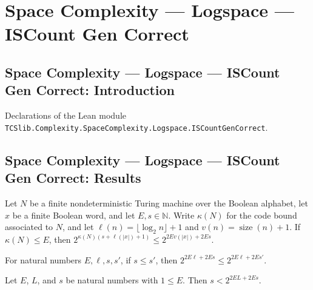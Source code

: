 \section{Space Complexity --- Logspace --- ISCount Gen Correct}
\subsection*{Space Complexity --- Logspace --- ISCount Gen Correct: Introduction}

Declarations of the Lean module \texttt{TCSlib.Complexity.SpaceComplexity.Logspace.ISCountGenCorrect}.

\subsection*{Space Complexity --- Logspace --- ISCount Gen Correct: Results}

\begin{lemma}
\label{Complexity.LogProg.ISGen.code_le_gKv}
\leanok
{}
Let $N$ be a finite nondeterministic Turing machine over the Boolean alphabet, let $x$
be a finite Boolean word, and let $E,s\in\mathbb N$. Write $\kappa(N)$ for the code
bound associated to $N$, and let $\ell(n)=\lfloor\log_2 n\rfloor+1$ and
$v(n)=\operatorname{size}(n)+1$. If $\kappa(N)\le E$, then
$2^{\kappa(N)(s+\ell(|x|)+1)}\le 2^{2E v(|x|)+2Es}$.
\end{lemma}

\begin{lemma}
\label{Complexity.LogProg.ISGen.gKv_mono}
\leanok
{}
For natural numbers $E,\ell,s,s'$, if $s\le s'$, then $2^{2E\ell+2Es}\le
2^{2E\ell+2Es'}$.
\end{lemma}

\begin{lemma}
\label{Complexity.LogProg.ISGen.lt_gKv}
\leanok
{}
Let $E$, $L$, and $s$ be natural numbers with $1\le E$. Then $s<2^{2EL+2Es}$.
\end{lemma}

